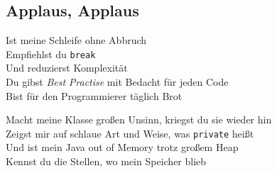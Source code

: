 \subsection{Applaus, Applaus}

 Ist meine Schleife ohne Abbruch  \\
Empfiehlst du \texttt{\footnotesize break} \\
 Und reduzierst Komplexität \\
 Du gibst \textit{Best }\textit{Practise} mit Bedacht für jeden Code \\
 Bist für den Programmierer täglich Brot \\


 Macht meine Klasse großen Unsinn, kriegst du sie wieder hin \\
 Zeigst mir auf schlaue Art und Weise, was \texttt{\footnotesize private} heißt \\
 Und ist mein Java out of Memory trotz großem Heap \\
 Kennst du die Stellen, wo mein Speicher blieb \\

  
\pagebreak
